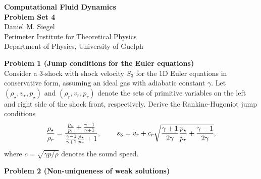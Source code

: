 \documentclass[letter,11pt]{article}
\begin{document}
\pagestyle{problem_set}


\phantom{.}
\begin{center}
{\Large\textbf{Computational Fluid Dynamics\\[0.4cm] Problem Set 4}} \\[0.7cm]
Daniel M. Siegel \\[0.1cm]
Perimeter Institute for Theoretical Physics\\
Department of Physics, University of Guelph
\end{center}

\vspace{1cm}

{\noindent\large\textbf{Problem 1 (Jump conditions for the Euler equations)}}\\[0.1cm]

\noindent Consider a 3-shock with shock velocity $S_3$ for the 1D Euler equations in conservative form, assuming an ideal gas with adiabatic constant $\gamma$. Let $(\rho_\star, v_\star, p_\star)$ and $(\rho_r, v_r, p_r)$ denote the sets of primitive variables on the left and right side of the shock front, respectively. Derive the Rankine-Hugoniot jump conditions
\begin{equation}
  \frac{\rho_\star}{\rho_r} = \frac{\frac{p_\star}{p_r}+ \frac{\gamma-1}{\gamma+1}}{\frac{\gamma-1}{\gamma+1}\frac{p_\star}{p_r} + 1}, \mskip40mu s_3 = v_r + c_r \sqrt{\frac{\gamma + 1}{2\gamma}\frac{p_\star}{p_r}+\frac{\gamma-1}{2\gamma}},
\end{equation}
where $c=\sqrt{\gamma p / \rho}$ denotes the sound speed.

\vspace{2cm}

{\noindent\large\textbf{Problem 2 (Non-uniqueness of weak solutions)}}\\[-0.4cm]
\end{document}
